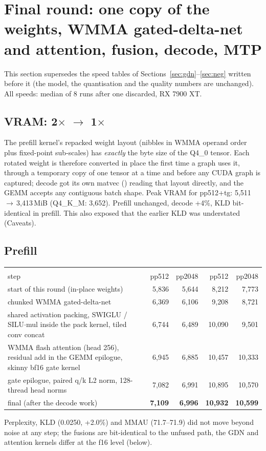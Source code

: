 \documentclass[10pt,a4paper]{article}
\newcommand{\tx}[1]{\texttt{\detokenize{#1}}}
\begin{document}
\section{Final round: one copy of the weights, WMMA gated-delta-net and attention, fusion, decode, MTP}
\label{sec:final}
This section supersedes the speed tables of Sections~\ref{sec:gdn}--\ref{sec:neg} written before it (the model, the
quantisation and the quality numbers are unchanged). All speeds: median of 8 \tx{llama-bench} runs after one discarded, RX 7900 XT.

\subsection{VRAM: 2$\times$ $\to$ 1$\times$}
The prefill kernel's repacked weight layout (nibbles in WMMA operand order plus fixed-point sub-scales) has \emph{exactly} the byte
size of the Q4\_0 tensor. Each rotated weight is therefore converted in place the first time a graph uses it, through a temporary copy
of one tensor at a time and before any CUDA graph is captured; decode got its own matvec (\tx{k_mv}) reading that layout directly, and
the GEMM accepts any contiguous batch shape. Peak VRAM for pp512+tg: 5{,}511\,$\to$\,3{,}413\,MiB (Q4\_K\_M: 3{,}652). Prefill
unchanged, decode +4\%, KLD bit-identical in prefill. This also exposed that the earlier \tx{fast} KLD was understated (Caveats).

\subsection{Prefill}
\begin{center}\small
\begin{tabular}{@{}p{7.4cm}rrrr@{}}
\toprule
 & \multicolumn{2}{c}{\tx{quality}} & \multicolumn{2}{c}{\tx{fast}}\\
step & pp512 & pp2048 & pp512 & pp2048\\
\midrule
start of this round (in-place weights) & 5{,}836 & 5{,}644 & 8{,}212 & 7{,}773\\
chunked WMMA gated-delta-net & 6{,}369 & 6{,}106 & 9{,}208 & 8{,}721\\
shared activation packing, SWIGLU / SILU$\cdot$mul inside the pack kernel, tiled conv concat & 6{,}744 & 6{,}489 & 10{,}090 & 9{,}501\\
WMMA flash attention (head 256), residual add in the GEMM epilogue, skinny bf16 gate kernel & 6{,}945 & 6{,}885 & 10{,}457 & 10{,}333\\
gate epilogue, paired q/k L2 norm, 128-thread head norms & 7{,}082 & 6{,}991 & 10{,}895 & 10{,}570\\
final (after the decode work) & \textbf{7{,}109} & \textbf{6{,}996} & \textbf{10{,}932} & \textbf{10{,}599}\\
\bottomrule
\end{tabular}
\end{center}
Perplexity, KLD (0.0250, +2.0\%) and MMAU (71.7--71.9) did not move beyond noise at any step; the fusions are bit-identical to the unfused
path, the GDN and attention kernels differ at the f16 level (below).
\end{document}

